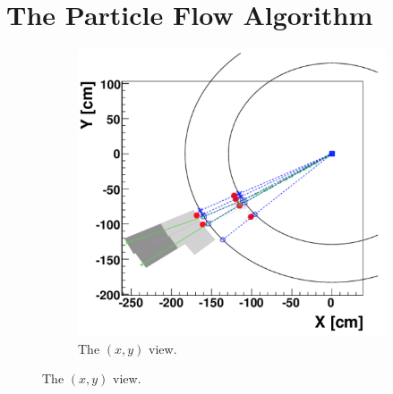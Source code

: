 \section{The Particle Flow Algorithm}

\begin{figure}
	\centering
	\begin{subfigure}{1\textwidth}
		\includegraphics[width=.8\linewidth]{analysis/pics/PF_a.png}
		\caption{The $(x, y)$ view.}
		\label{fig:PF_a}
	\end{subfigure}
	

\end{figure}
